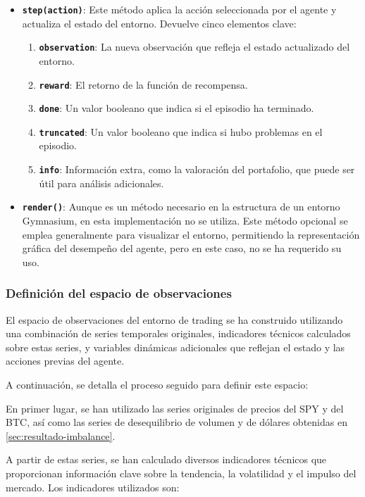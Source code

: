 \documentclass[a4paper,12pt]{report}
\begin{document}
\begin{itemize}
\begin{itemize}
        \item \textbf{\texttt{step(action)}}: Este método aplica la acción seleccionada por el agente y actualiza el estado del entorno. Devuelve cinco elementos clave:
        \begin{enumerate}
            \item \textbf{\texttt{observation}}: La nueva observación que refleja el estado actualizado del entorno.
            \item \textbf{\texttt{reward}}: El retorno de la función de recompensa.
            \item \textbf{\texttt{done}}: Un valor booleano que indica si el episodio ha terminado.
            \item \textbf{\texttt{truncated}}: Un valor booleano que indica si hubo problemas en el episodio.
            \item \textbf{\texttt{info}}: Información extra, como la valoración del portafolio, que puede ser útil para análisis adicionales.
        \end{enumerate}

        \item \textbf{\texttt{render()}}: Aunque es un método necesario en la estructura de un entorno Gymnasium, en esta implementación no se utiliza. Este método opcional se emplea generalmente para visualizar el entorno, permitiendo la representación gráfica del desempeño del agente, pero en este caso, no se ha requerido su uso.
    \end{itemize}
\end{itemize}

\subsubsection{Definición del espacio de observaciones}


El espacio de observaciones del entorno de trading se ha construido utilizando una 
combinación de series temporales originales, indicadores técnicos calculados sobre 
estas series, y variables dinámicas adicionales que reflejan el estado y las acciones 
previas del agente. 

A continuación, se detalla el proceso seguido para definir este espacio:

En primer lugar, se han utilizado las series originales de precios del SPY y del BTC, 
así como las series de desequilibrio de volumen y de dólares obtenidas en \ref{sec:resultado-imbalance}.

A partir de estas series, se han calculado diversos indicadores técnicos que proporcionan información clave sobre la tendencia, la volatilidad y el impulso del mercado. Los indicadores utilizados son:
\end{document}
